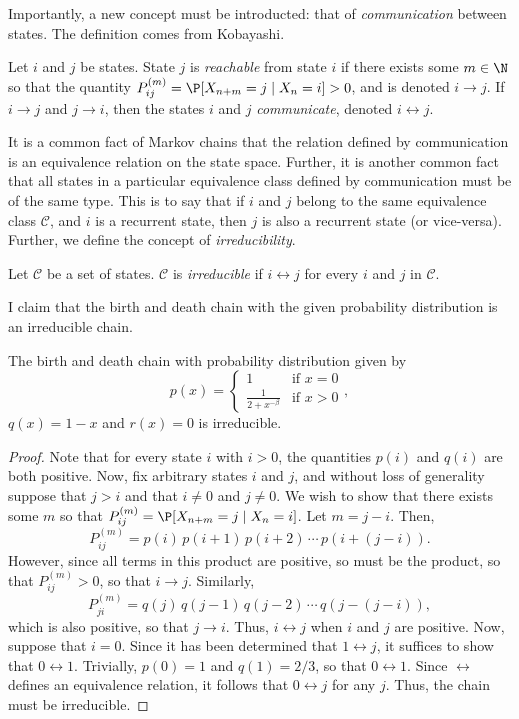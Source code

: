 Importantly, a new concept must be introducted: that of \emph{communication} between states. The
definition comes from Kobayashi.
\begin{definition}
    Let $i$ and $j$ be states. State $j$ is \emph{reachable} from state $i$ if there exists some $m \in
    \N$ so that the quantity $P_{ij}^{(m)} = \P[X_{n+m} = j \mid X_n =i] > 0$, and is denoted $i \to j$.
    If $i \to j$ and $j \to i$, then the states $i$ and $j$ \emph{communicate}, denoted $i
    \leftrightarrow j$.
\end{definition}
It is a common fact of Markov chains that the relation defined by communication is an equivalence
relation on the state space. Further, it is another common fact that all states in a particular
equivalence class defined by communication must be of the same type. This is to say that if $i$ and $j$
belong to the same equivalence class $\mathcal{C}$, and $i$ is a recurrent state, then $j$ is also a
recurrent state (or vice-versa). Further, we define the concept of \emph{irreducibility}.
\begin{definition}
    Let $\mathcal{C}$ be a set of states. $\mathcal{C}$ is \emph{irreducible} if $i \leftrightarrow j$
    for every $i$ and $j$ in $\mathcal{C}$.
\end{definition}

I claim that the birth and death chain with the given probability distribution is an irreducible chain.
\begin{proposition}
    The birth and death chain with probability distribution given by
    \[
        p(x) = \begin{cases}
            1 & \text{if } x = 0 \\
            \frac{1}{2+x^{-\beta}} & \text{if } x > 0
        \end{cases},
    \]
    $q(x) = 1-x$ and $r(x) = 0$ is irreducible.
\end{proposition}
\begin{proof}
    Note that for every state $i$ with $i > 0$, the quantities $p(i)$ and $q(i)$ are both positive.
    Now, fix arbitrary states $i$ and $j$, and without loss of generality suppose that $j > i$ and that
    $i \neq 0$ and $j \neq 0$. We wish to show that there exists some $m$ so that $P_{ij}^{(m)} =
    \P[X_{n+m} = j \mid X_n = i]$. Let $m = j-i$. Then, 
    \[
        P_{ij}^{(m)} = p(i)\, p(i+1)\, p(i+2)\, \cdots \, p(i+(j-i)).
    \]
    However, since all terms in this product are positive, so must be the product, so that $P_{ij}^{(m)}
    > 0$, so that $i \to j$. Similarly,
    \[
        P_{ji}^{(m)} = q(j)\, q(j-1)\, q(j-2) \, \cdots \, q(j-(j-i)),
    \]
    which is also positive, so that $j \to i$. Thus, $i \leftrightarrow j$ when $i$ and $j$ are
    positive. Now, suppose that $i = 0$. Since it has been determined that $1 \leftrightarrow j$, it
    suffices to show that $0 \leftrightarrow 1$. Trivially, $p(0) = 1$ and $q(1) = 2/3$, so that $0
    \leftrightarrow 1$. Since $\leftrightarrow$ defines an equivalence relation, it follows that $0
    \leftrightarrow j$ for any $j$. Thus, the chain must be irreducible.
\end{proof}

